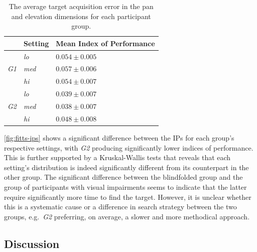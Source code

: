 \documentclass[acmsmall]{acmart}
\begin{document}

\begin{table}
  \centering
  \caption{The average target acquisition error in the pan and elevation dimensions for each participant group. }\label{tab:fitts-results}
  \begin{tabular}{p{0.5cm}p{1.5cm}p{2.5cm}}
    \toprule
                & Setting      & Mean Index of Performance \\ \midrule
                & \textit{lo}  & $0.054\pm0.005$ \\
    \textit{G1} & \textit{med} & $0.057\pm0.006$ \\
		& \textit{hi}  & $0.054\pm0.007$ \\ \cline{2-3}
                & \textit{lo}  & $0.039\pm0.007$ \\
    \textit{G2} & \textit{med} & $0.038\pm0.007$ \\
                & \textit{hi}  & $0.048\pm0.008$ \\
    \bottomrule
  \end{tabular}
\end{table}

\cref{fig:fitts-ips} shows a significant difference between the IPs for each group's respective settings, with \textit{G2} producing significantly lower indices of performance.
This is further supported by a Kruskal-Wallis tests that reveals that each setting's distribution is indeed significantly different from its counterpart in the other group.
The significant difference between the blindfolded group and the group of participants with visual impairments seems to indicate that the latter require significantly more time to find the target. 
However, it is unclear whether this is a systematic cause or a difference in search strategy between the two groups, e.g.\ \textit{G2} preferring, on average, a slower and more methodical approach.

\subsection{Discussion}
\end{document}
